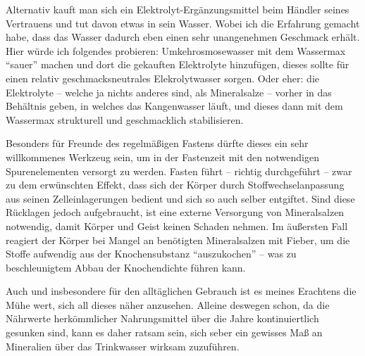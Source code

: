 \documentclass[a5paper,fontsize=10pt]{memoir}
\begin{document}
Alternativ kauft man sich ein Elektrolyt-Ergänzungsmittel 
beim Händler seines Vertrauens 
und tut davon etwas in sein Wasser. 
Wobei ich die Erfahrung gemacht habe, 
dass das Wasser dadurch eben einen sehr unangenehmen Geschmack erhält. 
Hier würde ich folgendes probieren: 
Umkehrosmosewasser mit dem Wassermax ``sauer'' machen 
und dort die gekauften Elektrolyte hinzufügen, 
dieses sollte für einen relativ geschmacksneutrales Elekrolytwasser sorgen. 
Oder eher: die Elektrolyte 
-- welche ja nichts anderes sind, als Mineralsalze 
-- vorher in das Behältnis geben, in welches das Kangenwasser läuft, 
und dieses dann mit dem Wassermax strukturell und geschmacklich stabilisieren.

Besonders für Freunde des regelmäßigen Fastens 
dürfte dieses ein sehr willkommenes Werkzeug sein, 
um in der Fastenzeit mit den notwendigen Spurenelementen versorgt zu werden. 
Fasten führt -- richtig durchgeführt -- zwar zu dem erwünschten Effekt, 
dass sich der Körper durch Stoffwechselanpassung 
aus seinen Zelleinlagerungen bedient 
und sich so auch selber entgiftet. 
Sind diese Rücklagen jedoch aufgebraucht, 
ist eine externe Versorgung von Mineralsalzen notwendig, 
damit Körper und Geist keinen Schaden nehmen. 
Im äußersten Fall reagiert der Körper 
bei Mangel an benötigten Mineralsalzen 
mit Fieber, 
um die Stoffe aufwendig aus der Knochensubstanz ``auszukochen'' 
-- was zu beschleunigtem Abbau der Knochendichte führen kann.

Auch und insbesondere für den alltäglichen Gebrauch 
ist es meines Erachtens die Mühe wert, 
sich all dieses näher anzusehen. 
Alleine deswegen schon, 
da die Nährwerte herkömmlicher Nahrungsmittel
über die Jahre kontinuiertlich gesunken sind, 
kann es daher ratsam sein, 
sich seber ein gewisses Maß an Mineralien 
über das Trinkwasser wirksam zuzuführen.


\end{document}
